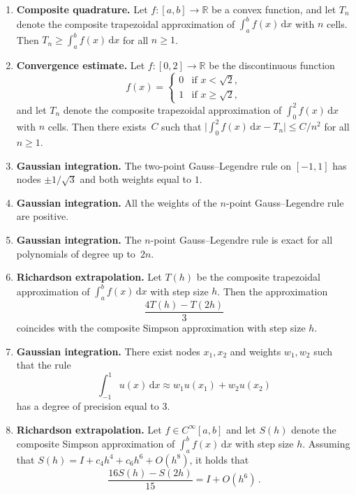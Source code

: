 \documentclass[a4paper]{article}
\renewcommand{\d}{\mathrm d}
\begin{document}
\begin{enumerate}
    \item
        \textbf{Composite quadrature.}
        Let $f \colon [a, b] \to \mathbb R$ be a convex function,
        and let $T_n$ denote the composite trapezoidal approximation of $\int_a^b f(x) \, \d x$ with $n$ cells.
        Then $T_n \geq \int_a^b f(x) \, \d x$ for all $n \geq 1$.

    \item
        \textbf{Convergence estimate.}
        Let $f \colon [0, 2] \to \mathbb R$ be the discontinuous function
        \[
            f(x) =
            \begin{cases}
                0 & \text{if } x < \sqrt{2}, \\
                1 & \text{if } x \geq \sqrt{2},
            \end{cases}
        \]
        and let $T_n$ denote the composite trapezoidal approximation of $\int_0^2 f(x) \, \d x$ with $n$ cells.
        Then there exists~$C$ such that $\lvert \int_0^2 f(x) \, \d x - T_n \rvert \leq C / n^2$ for all $n \geq 1$.

    \item
        \textbf{Gaussian integration.}
        The two-point Gauss--Legendre rule on $[-1, 1]$ has nodes $\pm 1/\sqrt{3}$ and both weights equal to $1$.

    \item
        \textbf{Gaussian integration.}
        All the weights of the $n$-point Gauss--Legendre rule are positive.

    \item
        \textbf{Gaussian integration.}
        The $n$-point Gauss--Legendre rule is exact for all polynomials of degree up to~$2n$.

    \item
        \textbf{Richardson extrapolation.}
        Let $T(h)$ be the composite trapezoidal approximation of $\int_a^b f(x) \, \d x$ with step size $h$.
        Then the approximation
        \[
            \frac{4 T(h) - T(2h)}{3}
        \]
        coincides with the composite Simpson approximation with step size $h$.

    \item
        \textbf{Gaussian integration.}
        There exist nodes $x_1, x_2$ and weights $w_1, w_2$ such that the rule
        \[
            \int_{-1}^{1} u(x) \, \d x \approx w_1 u(x_1) + w_2 u(x_2)
        \]
        has a degree of precision equal to $3$.

    \item
        \textbf{Richardson extrapolation.}
        Let $f \in C^{\infty}[a, b]$ and let $S(h)$ denote the composite Simpson approximation of $\int_a^b f(x) \, \d x$ with step size $h$.
        Assuming that $S(h) = I + c_4 h^4 + c_6 h^6 + O(h^8)$, it holds that
        \[
            \frac{16 S(h) - S(2h)}{15} = I + O(h^6)\,.
        \]


\end{enumerate}
\end{document}
